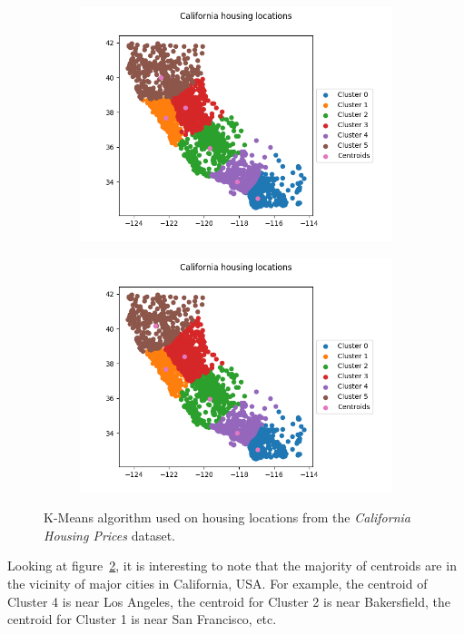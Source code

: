 \documentclass[a4paper]{article}
\begin{document}
\begin{figure}[!htp]
	\begin{subfigure}{0.5\columnwidth}
		\centering
		\includegraphics[width=\textwidth]{images/4.png}
		\caption{}
		\label{figure:iteration-4}
	\end{subfigure}\hfill
	\begin{subfigure}{0.5\columnwidth}
		\centering
		\includegraphics[width=\textwidth]{images/5.png}
		\caption{}
		\label{figure:iteration-5}
	\end{subfigure}
	
	\caption{K-Means algorithm used on housing locations from the \textit{California Housing Prices} dataset\cite{PJZZoRfZVMc9ZRlw}.}
	\label{figure:k-means-california-dataset}
\end{figure}
Looking at figure~\ref{figure:iteration-5}, it is interesting to note that the majority of centroids are in the vicinity of major cities in California, USA. For example, the centroid of Cluster 4 is near Los Angeles, the centroid for Cluster 2 is near Bakersfield, the centroid for Cluster 1 is near San Francisco, etc.
\end{document}
